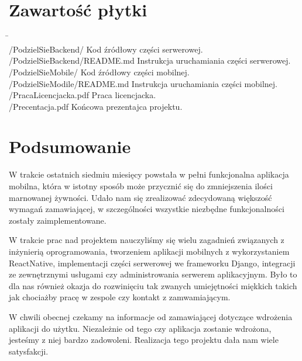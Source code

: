 \documentclass[licencjacka]{pracamgr}
\begin{document}
\chapter{Zawartość płytki}\label{r:build}
\begin{tabbing}
      \hspace{20em} \=   \hspace{10em} \\
    /PodzielSieBackend/ \> Kod źródłowy części serwerowej. \\
    /PodzielSieBackend/README.md \> Instrukcja uruchamiania części serwerowej. \\
    /PodzielSieMobile/ \> Kod źródłowy części mobilnej. \\
    /PodzielSieModile/README.md \> Instrukcja uruchamiania części mobilnej. \\
    /PracaLicencjacka.pdf \> Praca licencjacka. \\
    /Precentacja.pdf \> Końcowa prezentajca projektu. \\
\end{tabbing}

\chapter{Podsumowanie}\label{r:pods}
W trakcie ostatnich siedmiu miesięcy powstała w pełni funkcjonalna aplikacja mobilna, która w istotny sposób może przycznić się do zmniejszenia ilości marnowanej żywności. Udało nam się zrealizować zdecydowaną większość wymagań zamawiającej, w szczególności wszystkie niezbędne funkcjonalności zostały zaimplementowane. 

W trakcie prac nad projektem nauczyliśmy się wielu zagadnień związanych z inżynierią oprogramowania, tworzeniem aplikacji mobilnych z wykorzystaniem ReactNative, implementacji części serwerowej we frameworku Django, integracji ze zewnętrznymi usługami czy administrowania serwerem aplikacyjnym. Było to dla nas również okazja do rozwinięciu tak zwanych umiejętności miękkich takich jak chociażby pracę w zespole czy kontakt z zamwamiającym.

W chwili obecnej czekamy na informacje od zamawiającej dotyczące wdrożenia aplikacji do użytku. Niezależnie od tego czy aplikacja zostanie wdrożona, jesteśmy z niej bardzo zadowoleni. Realizacja tego projektu dała nam wiele satysfakcji. 
\end{document}
